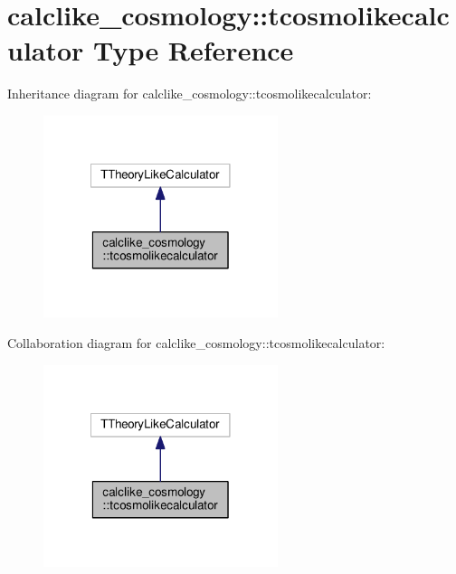 \hypertarget{structcalclike__cosmology_1_1tcosmolikecalculator}{}\section{calclike\+\_\+cosmology\+:\+:tcosmolikecalculator Type Reference}
\label{structcalclike__cosmology_1_1tcosmolikecalculator}


Inheritance diagram for calclike\+\_\+cosmology\+:\+:tcosmolikecalculator\+:
\nopagebreak
\begin{figure}[H]
\begin{center}
\leavevmode
\includegraphics[width=194pt]{structcalclike__cosmology_1_1tcosmolikecalculator__inherit__graph}
\end{center}
\end{figure}


Collaboration diagram for calclike\+\_\+cosmology\+:\+:tcosmolikecalculator\+:
\nopagebreak
\begin{figure}[H]
\begin{center}
\leavevmode
\includegraphics[width=194pt]{structcalclike__cosmology_1_1tcosmolikecalculator__coll__graph}
\end{center}
\end{figure}
